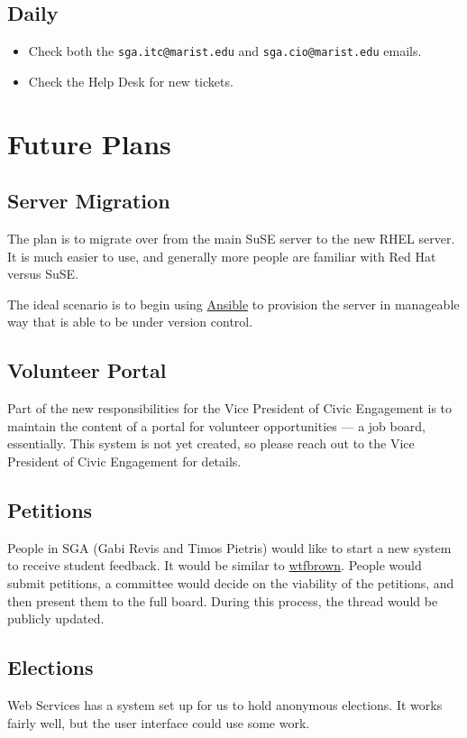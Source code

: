 \documentclass[11pt]{report}
\begin{document}
	\section{Daily}
		\begin{itemize}
			\item{Check both the \texttt{sga.itc@marist.edu} and \texttt{sga.cio@marist.edu}	emails.}
			\item{Check the Help Desk for new tickets.}
		\end{itemize}



\chapter{Future Plans}

	\section{Server Migration}
		The plan is to migrate over from the main SuSE server to the new RHEL server. It is much easier to use, and generally more people are familiar with Red Hat versus SuSE.

		The ideal scenario is to begin using \href{https://www.ansible.com/}{Ansible} to provision the server in manageable way that is able to be under version control.

	\section{Volunteer Portal}
		Part of the new responsibilities for the Vice President of Civic Engagement is to maintain the content of a portal for volunteer opportunities --- a job board, essentially. This system is not yet created, so please reach out to the Vice President of Civic Engagement for details.

	\section{Petitions}
		People in SGA (Gabi Revis and Timos Pietris) would like to start a new system to receive student feedback. It would be similar to \href{http://wtfbrown.com}{wtfbrown}. People would submit petitions, a committee would decide on the viability of the petitions, and then present them to the full board. During this process, the thread would be publicly updated.
	
	\section{Elections}
		Web Services has a system set up for us to hold anonymous elections. It works fairly well, but the user interface could use some work.
		
\end{document}
